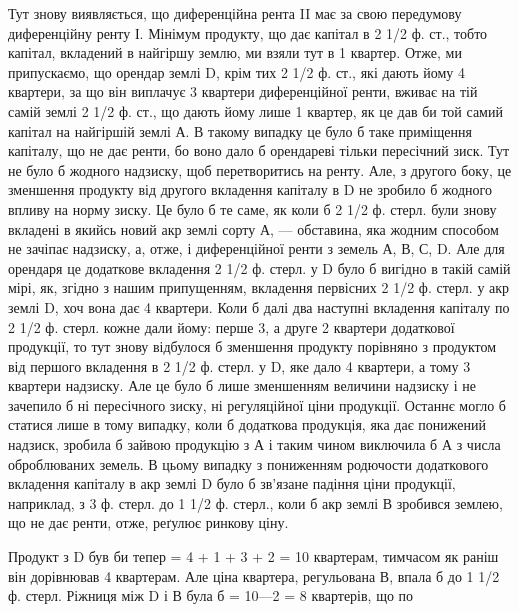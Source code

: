 Тут знову виявляється, що диференційна рента II має за свою передумову
диференційну ренту І. Мінімум продукту, що дає капітал в 2 1/2 ф. ст., тобто капітал,
вкладений в найгіршу землю, ми взяли тут в 1 квартер. Отже, ми припускаємо,
що орендар землі D, крім тих 2 1/2 ф. ст., які дають йому 4 квартери,
за що він виплачує 3 квартери диференційної ренти, вживає на тій самій землі
2 1/2 ф. ст., що дають йому лише 1 квартер, як це дав би той самий капітал на
найгіршій землі А. В такому випадку це було б таке приміщення капіталу,
що не дає ренти, бо воно дало б орендареві тільки пересічний зиск. Тут не
було б жодного надзиску, щоб перетворитись на ренту. Але, з другого боку, це
зменшення продукту від другого вкладення капіталу в D не зробило б жодного
впливу на норму зиску. Це було б те саме, як коли б 2 1/2 ф. стерл. були знову
вкладені в якийсь новий акр землі сорту А, — обставина, яка жодним способом
не зачіпає надзиску, а, отже, і диференційної ренти з земель А, В, С, D.
Але для орендаря це додаткове вкладення 2 1/2 ф. стерл. у D було б вигідно
в такій самій мірі, як, згідно з нашим припущенням, вкладення первісних
2 1/2 ф. стерл. у акр землі D, хоч вона дає 4 квартери. Коли б далі два наступні
вкладення капіталу по 2 1/2 ф. стерл. кожне дали йому: перше 3, а друге
2 квартери додаткової продукції, то тут знову відбулося б зменшення продукту
порівняно з продуктом від першого вкладення в 2 1/2 ф. стерл. у D, яке
дало 4 квартери, а тому 3 квартери надзиску. Але це було б лише зменшенням
величини надзиску і не зачепило б ні пересічного зиску, ні регуляційної ціни
продукції. Останнє могло б статися лише в тому випадку, коли б додаткова
продукція, яка дає понижений надзиск, зробила б зайвою продукцію з А і таким
чином виключила б А з числа оброблюваних земель. В цьому випадку
з пониженням родючости додаткового вкладення капіталу в акр землі D було б
зв’язане падіння ціни продукції, наприклад, з 3 ф. стерл. до 1 1/2 ф. стерл.,
коли б акр землі В зробився землею, що не дає ренти, отже, реґулює ринкову ціну.

Продукт з D був би тепер = 4 + 1 + 3 + 2 = 10 квартерам, тимчасом
як раніш він дорівнював 4 квартерам. Але ціна квартера, регульована В, впала б
до 1 1/2 ф. стерл. Ріжниця між D і В була б = 10—2 = 8 квартерів, що по
\parbreak{}  %
